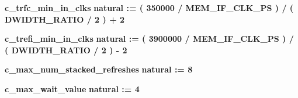 \begin{DoxyCompactItemize}
{\bf c\+\_\+trfc\+\_\+min\+\_\+in\+\_\+clks} {\bfseries \textcolor{comment}{natural}\textcolor{vhdlchar}{ }\textcolor{vhdlchar}{ }\textcolor{vhdlchar}{\+:}\textcolor{vhdlchar}{=}\textcolor{vhdlchar}{ }\textcolor{vhdlchar}{(}\textcolor{vhdlchar}{ }\textcolor{vhdlchar}{ } \textcolor{vhdldigit}{350000} \textcolor{vhdlchar}{/}\textcolor{vhdlchar}{ }\textcolor{vhdlchar}{ }\textcolor{vhdlchar}{ }{\bfseries {\bf M\+E\+M\+\_\+\+I\+F\+\_\+\+C\+L\+K\+\_\+\+PS}} \textcolor{vhdlchar}{ }\textcolor{vhdlchar}{)}\textcolor{vhdlchar}{ }\textcolor{vhdlchar}{/}\textcolor{vhdlchar}{ }\textcolor{vhdlchar}{(}\textcolor{vhdlchar}{ }\textcolor{vhdlchar}{ }\textcolor{vhdlchar}{ }\textcolor{vhdlchar}{ }{\bfseries {\bf D\+W\+I\+D\+T\+H\+\_\+\+R\+A\+T\+IO}} \textcolor{vhdlchar}{/}\textcolor{vhdlchar}{ } \textcolor{vhdldigit}{2} \textcolor{vhdlchar}{ }\textcolor{vhdlchar}{)}\textcolor{vhdlchar}{ }\textcolor{vhdlchar}{+}\textcolor{vhdlchar}{ } \textcolor{vhdldigit}{2} \textcolor{vhdlchar}{ }} 
\item 
{\bf c\+\_\+trefi\+\_\+min\+\_\+in\+\_\+clks} {\bfseries \textcolor{comment}{natural}\textcolor{vhdlchar}{ }\textcolor{vhdlchar}{ }\textcolor{vhdlchar}{\+:}\textcolor{vhdlchar}{=}\textcolor{vhdlchar}{ }\textcolor{vhdlchar}{(}\textcolor{vhdlchar}{ }\textcolor{vhdlchar}{ } \textcolor{vhdldigit}{3900000} \textcolor{vhdlchar}{/}\textcolor{vhdlchar}{ }\textcolor{vhdlchar}{ }\textcolor{vhdlchar}{ }{\bfseries {\bf M\+E\+M\+\_\+\+I\+F\+\_\+\+C\+L\+K\+\_\+\+PS}} \textcolor{vhdlchar}{ }\textcolor{vhdlchar}{)}\textcolor{vhdlchar}{ }\textcolor{vhdlchar}{/}\textcolor{vhdlchar}{ }\textcolor{vhdlchar}{(}\textcolor{vhdlchar}{ }\textcolor{vhdlchar}{ }\textcolor{vhdlchar}{ }\textcolor{vhdlchar}{ }{\bfseries {\bf D\+W\+I\+D\+T\+H\+\_\+\+R\+A\+T\+IO}} \textcolor{vhdlchar}{/}\textcolor{vhdlchar}{ } \textcolor{vhdldigit}{2} \textcolor{vhdlchar}{ }\textcolor{vhdlchar}{)}\textcolor{vhdlchar}{ }\textcolor{vhdlchar}{-\/}\textcolor{vhdlchar}{ } \textcolor{vhdldigit}{2} \textcolor{vhdlchar}{ }} 
\item 
{\bf c\+\_\+max\+\_\+num\+\_\+stacked\+\_\+refreshes} {\bfseries \textcolor{comment}{natural}\textcolor{vhdlchar}{ }\textcolor{vhdlchar}{ }\textcolor{vhdlchar}{\+:}\textcolor{vhdlchar}{=}\textcolor{vhdlchar}{ }\textcolor{vhdlchar}{ } \textcolor{vhdldigit}{8} \textcolor{vhdlchar}{ }} 
\item 
{\bf c\+\_\+max\+\_\+wait\+\_\+value} {\bfseries \textcolor{comment}{natural}\textcolor{vhdlchar}{ }\textcolor{vhdlchar}{ }\textcolor{vhdlchar}{\+:}\textcolor{vhdlchar}{=}\textcolor{vhdlchar}{ }\textcolor{vhdlchar}{ } \textcolor{vhdldigit}{4} \textcolor{vhdlchar}{ }} 

\end{DoxyCompactItemize}
